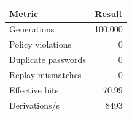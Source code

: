 \begin{tabular}{lr}
\toprule
Metric & Result \\
\midrule
Generations & 100,000 \\
Policy violations & 0 \\
Duplicate passwords & 0 \\
Replay mismatches & 0 \\
Effective bits & 70.99 \\
Derivations/s & 8493 \\
\bottomrule
\end{tabular}
